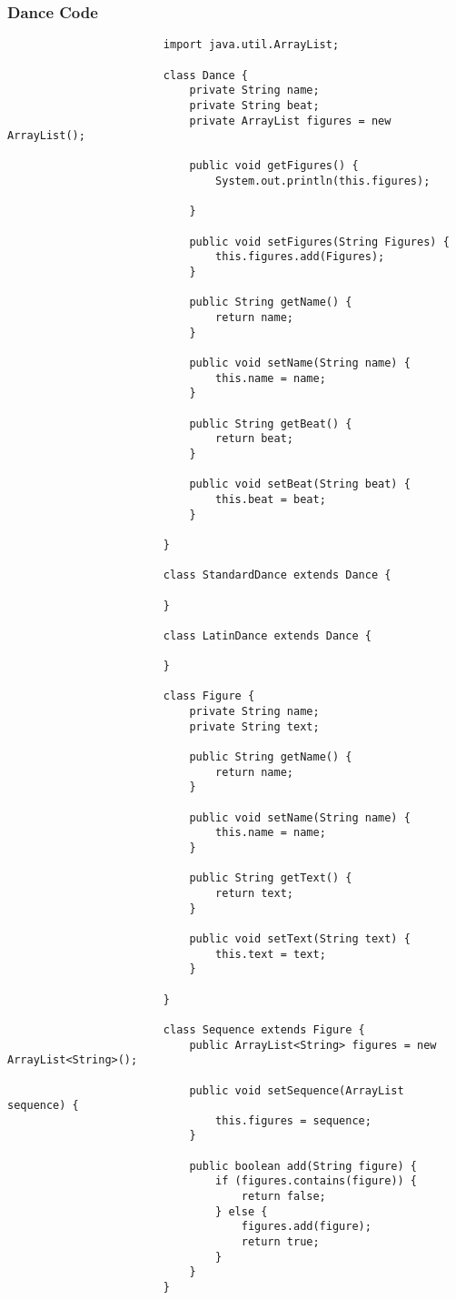 \documentclass[12pt,a4paper,oneside,ngerman]{article}
\begin{document}
                \subsubsection{Dance Code}
                    \begin{verbatim}
						import java.util.ArrayList;

						class Dance {
							private String name;
							private String beat;
							private ArrayList figures = new ArrayList();
						
							public void getFigures() {
								System.out.println(this.figures);
						
							}
						
							public void setFigures(String Figures) {
								this.figures.add(Figures);
							}
						
							public String getName() {
								return name;
							}
						
							public void setName(String name) {
								this.name = name;
							}
						
							public String getBeat() {
								return beat;
							}
						
							public void setBeat(String beat) {
								this.beat = beat;
							}
						
						}
						
						class StandardDance extends Dance {
						
						}
						
						class LatinDance extends Dance {
						
						}
						
						class Figure {
							private String name;
							private String text;
						
							public String getName() {
								return name;
							}
						
							public void setName(String name) {
								this.name = name;
							}
						
							public String getText() {
								return text;
							}
						
							public void setText(String text) {
								this.text = text;
							}
						
						}
						
						class Sequence extends Figure {
							public ArrayList<String> figures = new ArrayList<String>();
						
							public void setSequence(ArrayList sequence) {
								this.figures = sequence;
							}
						
							public boolean add(String figure) {
								if (figures.contains(figure)) {
									return false;
								} else {
									figures.add(figure);
									return true;
								}
							}
						}
					\end{verbatim}
\end{document}
